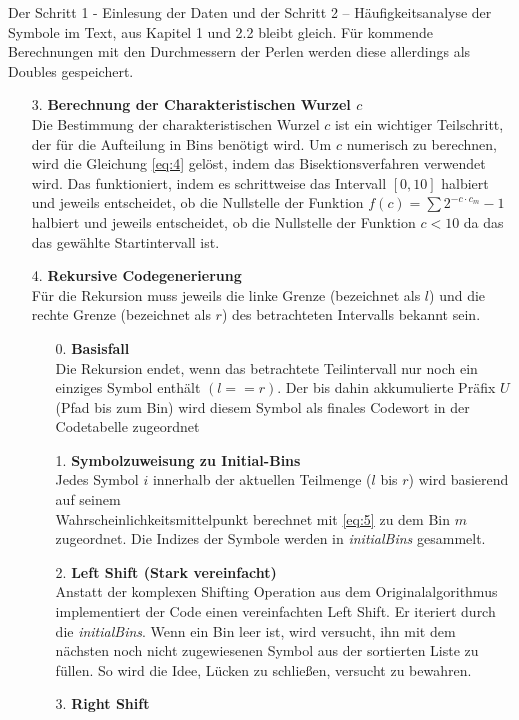 \documentclass[a4paper,10pt,ngerman]{scrartcl}
\begin{document}
Der Schritt 1 - Einlesung der Daten und der Schritt 2 – Häufigkeitsanalyse der Symbole im Text, aus Kapitel 1 und 2.2 bleibt gleich. Für kommende Berechnungen mit den Durchmessern der Perlen werden diese allerdings als Doubles gespeichert. 
\begin{enumerate}
  \item [3.] \textbf{Berechnung der Charakteristischen Wurzel $c$} \\
  Die Bestimmung der charakteristischen Wurzel $c$ ist ein wichtiger Teilschritt, der für die Aufteilung in Bins benötigt wird. Um $c$ numerisch zu berechnen, wird die Gleichung \ref{eq:4} gelöst, indem das Bisektionsverfahren verwendet wird. Das funktioniert, indem es schrittweise das Intervall $[0,10]$ halbiert und jeweils entscheidet, ob die Nullstelle der Funktion $f(c) = \sum 2^{-c \cdot c_m} - 1$ halbiert und jeweils entscheidet, ob die Nullstelle der Funktion $c<10$ da das das gewählte Startintervall ist.
  \item [4.] \textbf{Rekursive Codegenerierung}\\
  Für die Rekursion muss jeweils die linke Grenze (bezeichnet als $l$) und die rechte Grenze (bezeichnet als $r$) des betrachteten Intervalls bekannt sein. 
  \begin{enumerate}
    \item [0.] \textbf{Basisfall}\\
    Die Rekursion endet, wenn das betrachtete Teilintervall nur noch ein einziges Symbol enthält $(l == r)$. Der bis dahin akkumulierte Präfix $U$ (Pfad bis zum Bin) wird diesem Symbol als finales Codewort in der Codetabelle zugeordnet
    \item [1.] \textbf{Symbolzuweisung zu Initial-Bins}\\
    Jedes Symbol $i$ innerhalb der aktuellen Teilmenge ($l$ bis $r$) wird basierend auf seinem \\Wahrscheinlichkeitsmittelpunkt berechnet mit \ref{eq:5} zu dem Bin $m$ zugeordnet. Die Indizes der Symbole werden in \textit{initialBins} gesammelt. 
    \item [2.] \textbf{Left Shift (Stark vereinfacht)}\\
    Anstatt der komplexen Shifting Operation aus dem Originalalgorithmus implementiert der Code einen vereinfachten Left Shift. Er iteriert durch die \textit{initialBins}. Wenn ein Bin leer ist, wird versucht, ihn mit dem nächsten noch nicht zugewiesenen Symbol aus der sortierten Liste zu füllen. So wird die Idee, Lücken zu schließen, versucht zu bewahren. 
    \item [3.] \textbf{Right Shift}\\

\end{enumerate}
\end{enumerate}
\end{document}
